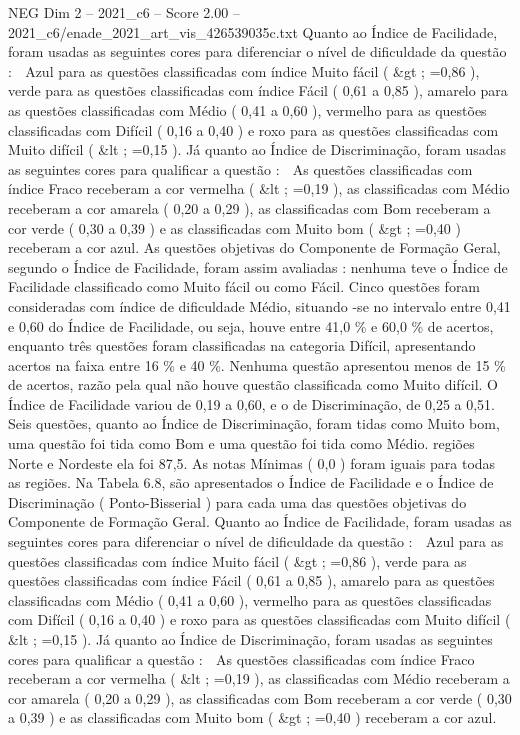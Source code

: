 \begin{textsample}{NEG Dim 2 – 2021\_c6 – Score 2.00 – 2021\_c6/enade\_2021\_art\_vis\_426539035c.txt}
Quanto ao Índice de Facilidade, foram usadas as seguintes cores para diferenciar o nível de dificuldade da questão :  Azul para as questões classificadas com índice Muito fácil ( \&gt ; =0,86 ), verde para as questões classificadas com índice Fácil ( 0,61 a 0,85 ), amarelo para as questões classificadas com Médio ( 0,41 a 0,60 ), vermelho para as questões classificadas com Difícil ( 0,16 a 0,40 ) e roxo para as questões classificadas com Muito difícil ( \&lt ; =0,15 ).
Já quanto ao Índice de Discriminação, foram usadas as seguintes cores para qualificar a questão :  As questões classificadas com índice Fraco receberam a cor vermelha ( \&lt ; =0,19 ), as classificadas com Médio receberam a cor amarela ( 0,20 a 0,29 ), as classificadas com Bom receberam a cor verde ( 0,30 a 0,39 ) e as classificadas com Muito bom ( \&gt ; =0,40 ) receberam a cor azul.
As questões objetivas do Componente de Formação Geral, segundo o Índice de Facilidade, foram assim avaliadas : nenhuma teve o Índice de Facilidade classificado como Muito fácil ou como Fácil.
Cinco questões foram consideradas com índice de dificuldade Médio, situando -se no intervalo entre 0,41 e 0,60 do Índice de Facilidade, ou seja, houve entre 41,0 \% e 60,0 \% de acertos, enquanto três questões foram classificadas na categoria Difícil, apresentando acertos na faixa entre 16 \% e 40 \%.
Nenhuma questão apresentou menos de 15 \% de acertos, razão pela qual não houve questão classificada como Muito difícil.
O Índice de Facilidade variou de 0,19 a 0,60, e o de Discriminação, de 0,25 a 0,51.
Seis questões, quanto ao Índice de Discriminação, foram tidas como Muito bom, uma questão foi tida como Bom e uma questão foi tida como Médio. regiões Norte e Nordeste ela foi 87,5.
As notas Mínimas ( 0,0 ) foram iguais para todas as regiões.
Na Tabela 6.8, são apresentados o Índice de Facilidade e o Índice de Discriminação ( Ponto-Bisserial ) para cada uma das questões objetivas do Componente de Formação Geral.
Quanto ao Índice de Facilidade, foram usadas as seguintes cores para diferenciar o nível de dificuldade da questão :  Azul para as questões classificadas com índice Muito fácil ( \&gt ; =0,86 ), verde para as questões classificadas com índice Fácil ( 0,61 a 0,85 ), amarelo para as questões classificadas com Médio ( 0,41 a 0,60 ), vermelho para as questões classificadas com Difícil ( 0,16 a 0,40 ) e roxo para as questões classificadas com Muito difícil ( \&lt ; =0,15 ).
Já quanto ao Índice de Discriminação, foram usadas as seguintes cores para qualificar a questão :  As questões classificadas com índice Fraco receberam a cor vermelha ( \&lt ; =0,19 ), as classificadas com Médio receberam a cor amarela ( 0,20 a 0,29 ), as classificadas com Bom receberam a cor verde ( 0,30 a 0,39 ) e as classificadas com Muito bom ( \&gt ; =0,40 ) receberam a cor azul.

\end{textsample}

